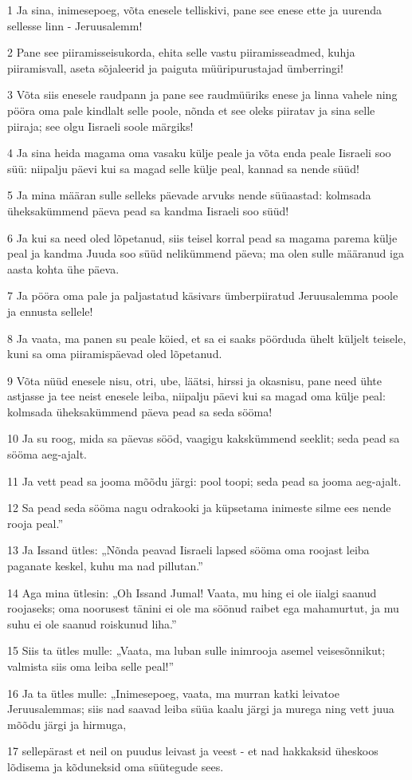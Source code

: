 \par 1 Ja sina, inimesepoeg, võta enesele telliskivi, pane see enese ette ja uurenda sellesse linn - Jeruusalemm!
\par 2 Pane see piiramisseisukorda, ehita selle vastu piiramisseadmed, kuhja piiramisvall, aseta sõjaleerid ja paiguta müüripurustajad ümberringi!
\par 3 Võta siis enesele raudpann ja pane see raudmüüriks enese ja linna vahele ning pööra oma pale kindlalt selle poole, nõnda et see oleks piiratav ja sina selle piiraja; see olgu Iisraeli soole märgiks!
\par 4 Ja sina heida magama oma vasaku külje peale ja võta enda peale Iisraeli soo süü: niipalju päevi kui sa magad selle külje peal, kannad sa nende süüd!
\par 5 Ja mina määran sulle selleks päevade arvuks nende süüaastad: kolmsada üheksakümmend päeva pead sa kandma Iisraeli soo süüd!
\par 6 Ja kui sa need oled lõpetanud, siis teisel korral pead sa magama parema külje peal ja kandma Juuda soo süüd nelikümmend päeva; ma olen sulle määranud iga aasta kohta ühe päeva.
\par 7 Ja pööra oma pale ja paljastatud käsivars ümberpiiratud Jeruusalemma poole ja ennusta sellele!
\par 8 Ja vaata, ma panen su peale köied, et sa ei saaks pöörduda ühelt küljelt teisele, kuni sa oma piiramispäevad oled lõpetanud.
\par 9 Võta nüüd enesele nisu, otri, ube, läätsi, hirssi ja okasnisu, pane need ühte astjasse ja tee neist enesele leiba, niipalju päevi kui sa magad oma külje peal: kolmsada üheksakümmend päeva pead sa seda sööma!
\par 10 Ja su roog, mida sa päevas sööd, vaagigu kakskümmend seeklit; seda pead sa sööma aeg-ajalt.
\par 11 Ja vett pead sa jooma mõõdu järgi: pool toopi; seda pead sa jooma aeg-ajalt.
\par 12 Sa pead seda sööma nagu odrakooki ja küpsetama inimeste silme ees nende rooja peal.”
\par 13 Ja Issand ütles: „Nõnda peavad Iisraeli lapsed sööma oma roojast leiba paganate keskel, kuhu ma nad pillutan.”
\par 14 Aga mina ütlesin: „Oh Issand Jumal! Vaata, mu hing ei ole iialgi saanud roojaseks; oma noorusest tänini ei ole ma söönud raibet ega mahamurtut, ja mu suhu ei ole saanud roiskunud liha.”
\par 15 Siis ta ütles mulle: „Vaata, ma luban sulle inimrooja asemel veisesõnnikut; valmista siis oma leiba selle peal!”
\par 16 Ja ta ütles mulle: „Inimesepoeg, vaata, ma murran katki leivatoe Jeruusalemmas; siis nad saavad leiba süüa kaalu järgi ja murega ning vett juua mõõdu järgi ja hirmuga,
\par 17 sellepärast et neil on puudus leivast ja veest - et nad hakkaksid üheskoos lõdisema ja kõduneksid oma süütegude sees.

